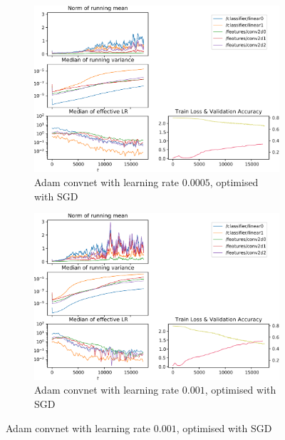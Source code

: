 \begin{figure}
    \caption{Adam metrics on the Adam-Convnet with different learning rates and
    SGD optimiser}
    \begin{subfigure}{\textwidth}
        \centering
        \includegraphics[width=\linewidth]{gfx/diagrams/experiments/adam/adammodel_sgd_00005_0_-1.pdf}
        \caption{Adam convnet with learning rate $0.0005$, optimised with SGD}
    \end{subfigure}

    \begin{subfigure}{\textwidth}
        \centering
        \includegraphics[width=\linewidth]{gfx/diagrams/experiments/adam/adammodel_sgd_0001_0_-1.pdf}
        \caption{Adam convnet with learning rate $0.001$, optimised with SGD}
    \end{subfigure}


\end{figure}
